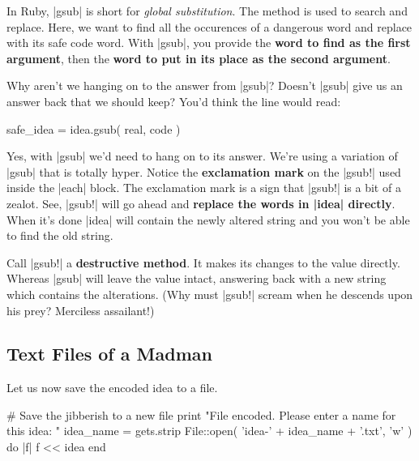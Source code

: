 \documentclass[12pt,twoside]{report}
\begin{document}
In Ruby, \rubyinline|gsub| is short for {\em global
  substitution}.  The method is used to search and replace. Here, we
want to find all the occurences of a dangerous word and replace with
its safe code word.  With \rubyinline|gsub|, you
provide the {\bf word to find as the first argument}, then the {\bf
  word to put in its place as the second argument}.

Why aren't we hanging on to the answer from
\rubyinline|gsub|?  Doesn't
\rubyinline|gsub| give us an answer back that we
should keep?  You'd think the line would read:


\begin{rubycode}

 safe_idea = idea.gsub( real, code )

\end{rubycode}


Yes, with \rubyinline|gsub| we'd need to hang on to
its answer.  We're using a variation of
\rubyinline|gsub| that is totally hyper.  Notice the
{\bf exclamation mark} on the \rubyinline|gsub!| used
inside the \rubyinline|each| block.  The exclamation
mark is a sign that \rubyinline|gsub!| is a bit of a
zealot.  See, \rubyinline|gsub!| will go ahead and
{\bf replace the words in \rubyinline|idea| directly}.
When it's done \rubyinline|idea| will contain the
newly altered string and you won't be able to find the old string.

Call \rubyinline|gsub!| a {\bf destructive method}.
It makes its changes to the value directly.  Whereas
\rubyinline|gsub| will leave the value intact,
answering back with a new string which contains the alterations. (Why
must \rubyinline|gsub!| scream when he descends upon
his prey?  Merciless assailant!)

\newpage



\subsection{Text Files of a Madman}



Let us now save the encoded idea to a file.


\begin{rubycode}

 # Save the jibberish to a new file
 print "File encoded.  Please enter a name for this idea: "
 idea_name = gets.strip
 File::open( 'idea-' + idea_name + '.txt', 'w' ) do |f|
   f << idea
 end

\end{rubycode}
\end{document}
